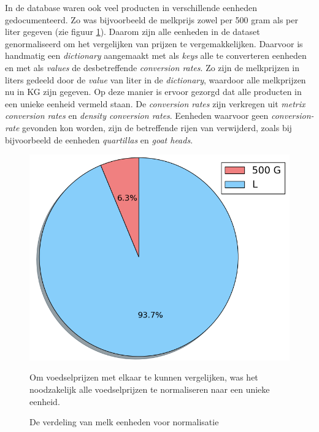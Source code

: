 \documentclass{article}
\begin{document}
In de database waren ook veel producten in verschillende eenheden gedocumenteerd. Zo was bijvoorbeeld de melkprijs zowel per 500 gram als per liter gegeven (zie figuur \ref{fig_milk}). Daarom zijn alle eenheden in de dataset genormaliseerd om het vergelijken van prijzen te vergemakkelijken. Daarvoor is handmatig een \textit{dictionary} aangemaakt met als \textit{keys} alle te converteren eenheden en met als \textit{values} de desbetreffende \textit{conversion rates}. Zo zijn de melkprijzen in liters gedeeld door de \textit{value} van liter in de \textit{dictionary}, waardoor alle melkprijzen nu in KG zijn gegeven. Op deze manier is ervoor gezorgd dat alle producten in een unieke eenheid vermeld staan. De \textit{conversion rates} zijn verkregen uit \textit{metrix conversion rates}\cite{conv} en \textit{density conversion rates}\cite{conversion}. Eenheden waarvoor geen \textit{conversion-rate} gevonden kon worden, zijn de betreffende rijen van verwijderd, zoals bij bijvoorbeeld de eenheden \textit{quartillas} en \textit{goat heads}.\\
 
\begin{figure}[h!]
\centering
\includegraphics[scale=0.25]{milk}
\caption{De verdeling van melk eenheden voor normalisatie}
\label{fig_milk}
\medskip
\small 
Om voedselprijzen met elkaar te kunnen vergelijken, was het noodzakelijk alle voedselprijzen te normaliseren naar een unieke eenheid.

 \end{figure}
\end{document}
